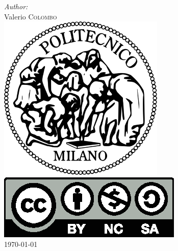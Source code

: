 \documentclass[12pt]{article}
\begin{document}
\begin{titlepage}
    \Large \emph{Author:}\\
    Valerio \textsc{Colombo}\\[3cm] %


    \includegraphics[scale=0.4]{images/Logo_Politecnico_Milano.png}\\[2cm] %


    \includegraphics[scale=0.4]{images/by-nc-sa.eps}\\[1cm]


    {\large \today}\\[2cm] %


    \newpage

\end{titlepage}
\end{document}
